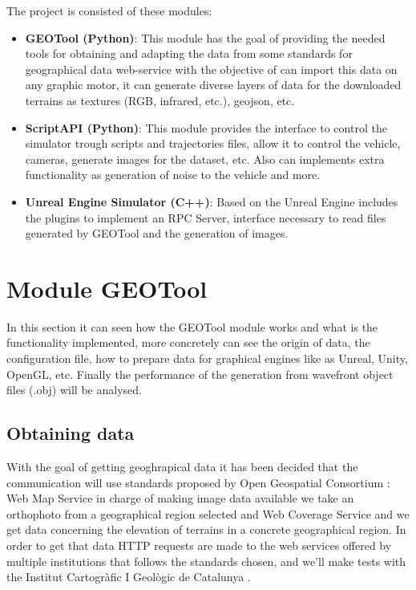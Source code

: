 \documentclass[10pt,a4paper,twocolumn,twoside]{article}
\begin{document}
The project is consisted of these modules:

\begin{itemize}
\setlength\itemsep{0em}
  \item \textbf{GEOTool (Python)}: This module has the goal of providing the needed tools for obtaining and adapting the data from some standards for geographical data web-service with the objective of can import this data on any graphic motor, it can generate diverse layers of data for the downloaded terrains as textures (RGB, infrared, etc.), geojson, etc. 
  
  \item \textbf{ScriptAPI (Python)}: This module provides the interface to control the simulator trough scripts and trajectories files, allow it to control the vehicle, cameras, generate images for the dataset, etc. Also can implements extra functionality as generation of noise to the vehicle and more.
  
  \item \textbf{Unreal Engine Simulator (C++)}: Based on the Unreal Engine includes the plugins to implement an RPC Server, interface necessary to read files generated by GEOTool and the generation of images.
\end{itemize}

\section{Module GEOTool}

In this section it can seen how the GEOTool module works and what is the functionality implemented, more concretely can see the origin of data, the configuration file, how to prepare data for graphical engines like as Unreal, Unity, OpenGL, etc. Finally the performance of the generation from wavefront object files (.obj) will be analysed.

\subsection{Obtaining data}
\label{getdata}

With the goal of getting geoghrapical data it has been decided that the communication will use standards proposed by Open Geospatial Consortium \cite{ogc}: Web Map Service \cite{wms} in charge of making image data available we take an orthophoto from a geographical region selected and Web Coverage Service \cite{wms} and we get data concerning the elevation of terrains in a concrete geographical region. In order to get that data HTTP requests are made to the web services offered by multiple institutions that follows the standards chosen, and we'll make tests with the Institut Cartogràfic I Geològic de Catalunya \cite{icgc}.
\end{document}
